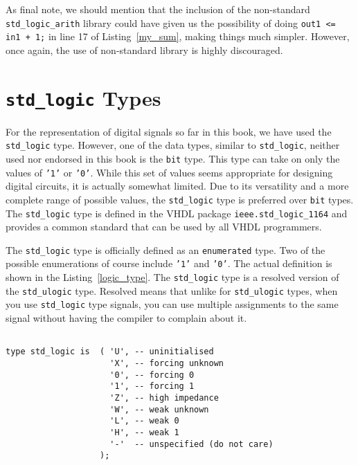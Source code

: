 As final note, we should mention that the inclusion of the non-standard \texttt{std\_logic\_arith} library could have given us the possibility of doing \texttt{out1 <= in1 + 1;} in line 17 of Listing~\ref{my_sum}, making things much simpler. However, once again, the use of non-standard library is highly discouraged.

\section{\texttt{std\_logic} Types}
For the representation of digital signals so far in this book, we have used the \texttt{std\_logic} type. However, one of the data types, similar to \texttt{std\_logic}, neither used nor endorsed in this book is the \texttt{bit} type. This type can take on only the values of \texttt{'1'} or \texttt{'0'}. While this set of values seems appropriate for designing digital circuits, it is actually somewhat limited. Due to its versatility and a more complete range of possible values, the \texttt{std\_logic} type is preferred over \texttt{bit} types. The \texttt{std\_logic} type is defined in the VHDL package \texttt{ieee.std\_logic\_1164} and provides a common standard that can be used by all VHDL programmers.

The \texttt{std\_logic} type is officially defined as an \texttt{enumerated} type. Two of the possible enumerations of course include \texttt{'1'} and \texttt{'0'}. The actual definition is shown in the Listing~\ref{logic_type}. The \texttt{std\_logic} type is a resolved version of the \texttt{std\_ulogic} type. Resolved means that unlike for \texttt{std\_ulogic} types, when you use \texttt{std\_logic} type signals, you can use multiple assignments to the same signal without having the compiler to complain about it.

\noindent
\begin{minipage}{0.99\linewidth}
\begin{lstlisting}[label=logic_type, caption=Declaration of the \texttt{std\_logic} enumerated type.]

type std_logic is  ( 'U', -- uninitialised
                     'X', -- forcing unknown
                     '0', -- forcing 0
                     '1', -- forcing 1
                     'Z', -- high impedance
                     'W', -- weak unknown
                     'L', -- weak 0
                     'H', -- weak 1
                     '-'  -- unspecified (do not care)
                   );
\end{lstlisting}
\end{minipage}

